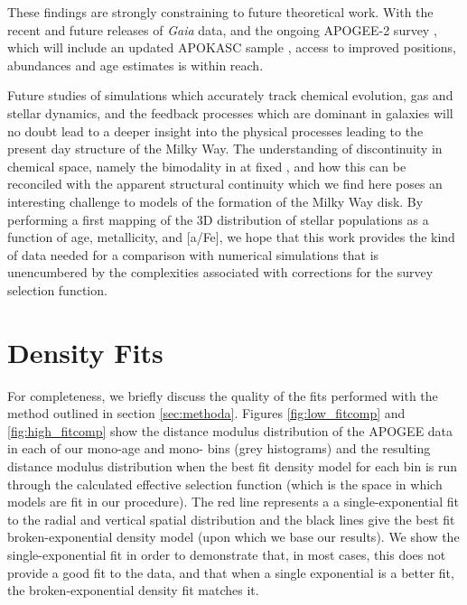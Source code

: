 These findings are strongly constraining to future theoretical work. With the recent \citep{2016arXiv160904303L} and future releases of \emph{Gaia} data, and the ongoing APOGEE-2 survey \citep{2014AAS...22344006S}, which will include an updated APOKASC sample \citep{2014ApJS..215...19P}, access to improved positions, abundances and age estimates is within reach. 

Future studies of simulations which accurately track chemical evolution, gas and stellar dynamics, and the feedback processes which are dominant in galaxies will no doubt lead to a deeper insight into the physical processes leading to the present day structure of the Milky Way. The understanding of discontinuity in chemical space, namely the bimodality in \afe{} at fixed \feh{}, and how this can be reconciled with the apparent structural continuity which we find here poses an interesting challenge to models of the formation of the Milky Way disk. By performing a first mapping of the 3D distribution of stellar populations as a function of age, metallicity, and [a/Fe], we hope that this work provides the kind of data needed for a comparison with numerical simulations that is unencumbered by the complexities associated with corrections for the survey selection function.








\section{Density Fits}
\label{sec:densityfits}
For completeness, we briefly discuss the quality of the fits performed with the method outlined in section \ref{sec:methoda}. Figures \ref{fig:low_fitcomp} and \ref{fig:high_fitcomp} show the distance modulus distribution of the APOGEE data in each of our mono-age and mono-\feh{} bins (grey histograms) and the resulting distance modulus distribution when the best fit density model for each bin is run through the calculated effective selection function (which is the space in which models are fit in our procedure). The red line represents a a single-exponential fit to the radial and vertical spatial distribution and the black lines give the best fit broken-exponential density model (upon which we base our results). We show the single-exponential fit in order to demonstrate that, in most cases, this does not provide a good fit to the data, and that when a single exponential is a better fit, the broken-exponential density fit matches it.

